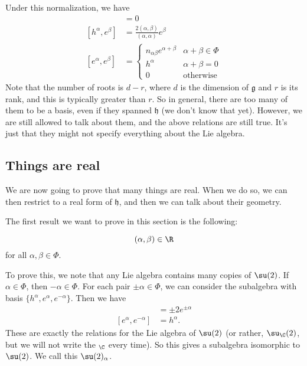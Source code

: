 \documentclass[a4paper]{article}
\begin{document}
Under this normalization, we have
\begin{align*}
  [h^\alpha, h^\beta] &= 0\\
  [h^\alpha, e^\beta] &= \frac{2(\alpha, \beta)}{(\alpha, \alpha)} e^\beta\\
  [e^\alpha, e^\beta] &=
  \begin{cases}
    n_{\alpha\beta} e^{\alpha + \beta} & \alpha + \beta \in \Phi\\
    h^\alpha & \alpha + \beta = 0\\
    0 & \text{otherwise}
  \end{cases}
\end{align*}
Note that the number of roots is $d - r$, where $d$ is the dimension of $\mathfrak{g}$ and $r$ is its rank, and this is typically greater than $r$. So in general, there are too many of them to be a basis, even if they spanned $\mathfrak{h}$ (we don't know that yet). However, we are still allowed to talk about them, and the above relations are still true. It's just that they might not specify everything about the Lie algebra.

\subsection{Things are real}
We are now going to prove that many things are real. When we do so, we can then restrict to a real form of $\mathfrak{h}$, and then we can talk about their geometry.

The first result we want to prove in this section is the following:
\begin{thm}
  \[
    (\alpha, \beta) \in \R
  \]
  for all $\alpha, \beta \in \Phi$.
\end{thm}

To prove this, we note that any Lie algebra contains many copies of $\su(2)$. If $\alpha \in \Phi$, then $-\alpha \in \Phi$. For each pair $\pm \alpha \in \Phi$, we can consider the subalgebra with basis $\{h^\alpha, e^\alpha, e^{-\alpha}\}$. Then we have
\begin{align*}
  [h^\alpha, e^{\pm \alpha}] &= \pm 2 e^{\pm \alpha}\\
  [e^{\alpha}, e^{-\alpha}] &= h^\alpha.
\end{align*}
These are exactly the relations for the Lie algebra of $\su(2)$ (or rather, $\su_\C(2)$, but we will not write the $_\C$ every time). So this gives a subalgebra isomorphic to $\su(2)$. We call this $\su(2)_\alpha$.
\end{document}
